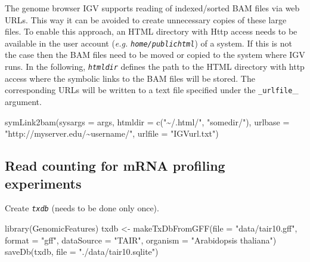 \documentclass[14pt,]{article}
\newcommand{\hlstr}[1]{\textcolor[rgb]{0.251,0.627,0.251}{#1}}%
\newcommand{\hlstd}[1]{\textcolor[rgb]{0.251,0.251,0.251}{#1}}%
\newenvironment{Shaded}{\begin{myshaded}}{\end{myshaded}}
\newcommand{\StringTok}[1]{\hlstr{#1}}
\newcommand{\OtherTok}[1]{{#1}}
\newcommand{\FunctionTok}[1]{\hlstd{#1}}
\newcommand{\AttributeTok}[1]{{#1}}
\newcommand{\NormalTok}[1]{\hlstd{#1}}
\begin{document}
The genome browser IGV supports reading of indexed/sorted BAM files via web URLs. This way it can be avoided to create unnecessary copies of these large files. To enable this approach, an HTML directory with Http access needs to be available in the user account (\emph{e.g.} \emph{\texttt{home/publichtml}}) of a system. If this is not the case then the BAM files need to be moved or copied to the system where IGV runs. In the following, \emph{\texttt{htmldir}} defines the path to the HTML directory with http access where the symbolic links to the BAM files will be stored. The corresponding URLs will be written to a text file specified under the \texttt{\_urlfile}\_ argument.

\begin{Shaded}
\begin{Highlighting}[]
\FunctionTok{symLink2bam}\NormalTok{(}\AttributeTok{sysargs =}\NormalTok{ args, }\AttributeTok{htmldir =} \FunctionTok{c}\NormalTok{(}\StringTok{"\textasciitilde{}/.html/"}\NormalTok{, }\StringTok{"somedir/"}\NormalTok{), }\AttributeTok{urlbase =} \StringTok{"http://myserver.edu/\textasciitilde{}username/"}\NormalTok{, }
    \AttributeTok{urlfile =} \StringTok{"IGVurl.txt"}\NormalTok{)}
\end{Highlighting}
\end{Shaded}

\hypertarget{read-counting-for-mrna-profiling-experiments}{%
\subsection{Read counting for mRNA profiling experiments}\label{read-counting-for-mrna-profiling-experiments}}

Create \emph{\texttt{txdb}} (needs to be done only once).

\begin{Shaded}
\begin{Highlighting}[]
\FunctionTok{library}\NormalTok{(GenomicFeatures)}
\NormalTok{txdb }\OtherTok{\textless{}{-}} \FunctionTok{makeTxDbFromGFF}\NormalTok{(}\AttributeTok{file =} \StringTok{"data/tair10.gff"}\NormalTok{, }\AttributeTok{format =} \StringTok{"gff"}\NormalTok{, }\AttributeTok{dataSource =} \StringTok{"TAIR"}\NormalTok{, }
    \AttributeTok{organism =} \StringTok{"Arabidopsis thaliana"}\NormalTok{)}
\FunctionTok{saveDb}\NormalTok{(txdb, }\AttributeTok{file =} \StringTok{"./data/tair10.sqlite"}\NormalTok{)}
\end{Highlighting}
\end{Shaded}
\end{document}
